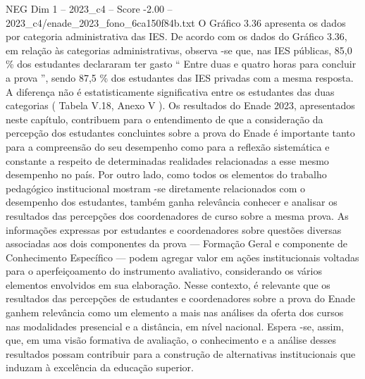 \begin{textsample}{NEG Dim 1 – 2023\_c4 – Score -2.00 – 2023\_c4/enade\_2023\_fono\_6ca150f84b.txt}
O Gráfico 3.36 apresenta os dados por categoria administrativa das IES.
De acordo com os dados do Gráfico 3.36, em relação às categorias administrativas, observa -se que, nas IES públicas, 85,0 \% dos estudantes declararam ter gasto “ Entre duas e quatro horas para concluir a prova ”, sendo 87,5 \% dos estudantes das IES privadas com a mesma resposta.
A diferença não é estatisticamente significativa entre os estudantes das duas categorias ( Tabela V.18, Anexo V ).
Os resultados do Enade 2023, apresentados neste capítulo, contribuem para o entendimento de que a consideração da percepção dos estudantes concluintes sobre a prova do Enade é importante tanto para a compreensão do seu desempenho como para a reflexão sistemática e constante a respeito de determinadas realidades relacionadas a esse mesmo desempenho no país.
Por outro lado, como todos os elementos do trabalho pedagógico institucional mostram -se diretamente relacionados com o desempenho dos estudantes, também ganha relevância conhecer e analisar os resultados das percepções dos coordenadores de curso sobre a mesma prova.
As informações expressas por estudantes e coordenadores sobre questões diversas associadas aos dois componentes da prova — Formação Geral e componente de Conhecimento Específico — podem agregar valor em ações institucionais voltadas para o aperfeiçoamento do instrumento avaliativo, considerando os vários elementos envolvidos em sua elaboração.
Nesse contexto, é relevante que os resultados das percepções de estudantes e coordenadores sobre a prova do Enade ganhem relevância como um elemento a mais nas análises da oferta dos cursos nas modalidades presencial e a distância, em nível nacional.
Espera -se, assim, que, em uma visão formativa de avaliação, o conhecimento e a análise desses resultados possam contribuir para a construção de alternativas institucionais que induzam à excelência da educação superior.

\end{textsample}
